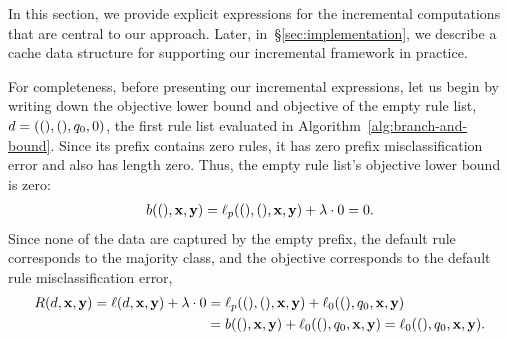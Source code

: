 \begin{arxiv}
In this section, we provide explicit expressions for
the incremental computations that are central to our approach.
%
Later, in~\S\ref{sec:implementation}, we describe a cache data structure
for supporting our incremental framework in practice.

For completeness, before presenting our incremental expressions,
let us begin by writing down the objective lower bound and objective
of the empty rule list, ${{d} = ((), (), q_0, 0)}$,
the first rule list evaluated in Algorithm~\ref{alg:branch-and-bound}.
%
Since its prefix contains zero rules, it has zero prefix
misclassification error and also has length zero.
%
Thus, the empty rule list's objective lower bound is zero:
\begin{align}
  b((), \x, \y) = \Loss_p((), (), \x, \y) + \Reg \cdot 0 = 0.
\end{align}
%
Since none of the data are captured by the empty prefix, the default rule
corresponds to the majority class, and the objective corresponds to the
default rule misclassification error, \ie
\begin{align}
  \Obj(\RL, \x, \y) = \Loss(\RL, \x, \y) + \Reg \cdot 0
  &= \Loss_p((), (), \x, \y) + \Loss_0((), \Default, \x, \y) \nn \\
  &= b((), \x, \y) + \Loss_0((), \Default, \x, \y) = \Loss_0((), \Default, \x, \y).
\end{align}


\end{arxiv}

